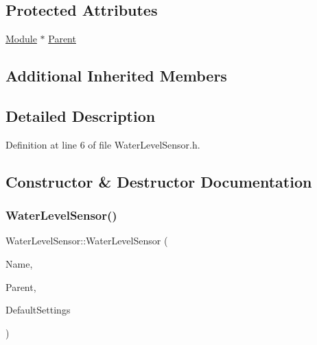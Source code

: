 \subsection*{Protected Attributes}
\begin{DoxyCompactItemize}
\item 
\hyperlink{class_module}{Module} $\ast$ \hyperlink{class_water_level_sensor_a5de4738d98dc4a28ecdf9614f5198dfc}{Parent}
\end{DoxyCompactItemize}
\subsection*{Additional Inherited Members}


\subsection{Detailed Description}


Definition at line 6 of file Water\+Level\+Sensor.\+h.



\subsection{Constructor \& Destructor Documentation}
\mbox{\label{class_water_level_sensor_aae6f402057511b5a9c30024dc483244c}} 
\subsubsection{\texorpdfstring{Water\+Level\+Sensor()}{WaterLevelSensor()}\hspace{0.1cm}{\footnotesize\ttfamily [1/2]}}
{\footnotesize\ttfamily Water\+Level\+Sensor\+::\+Water\+Level\+Sensor (\begin{DoxyParamCaption}\item[{const \+\_\+\+\_\+\+Flash\+String\+Helper $\ast$}]{Name,  }\item[{\hyperlink{class_module}{Module} $\ast$}]{Parent,  }\item[{\hyperlink{struct_settings_1_1_water_level_sensor_settings}{Settings\+::\+Water\+Level\+Sensor\+Settings} $\ast$}]{Default\+Settings }\end{DoxyParamCaption})}



